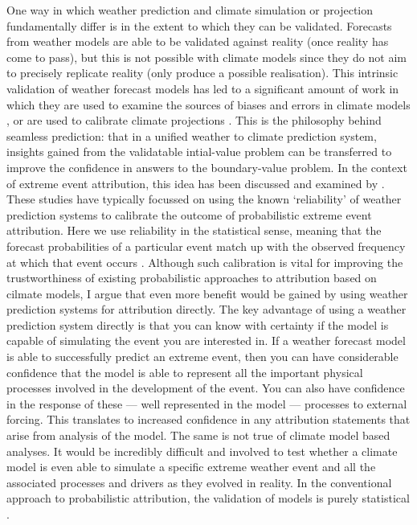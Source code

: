     One way in which weather prediction and climate simulation or projection fundamentally differ is in the extent to which they can be validated. Forecasts from weather models are able to be validated against reality (once reality has come to pass), but this is not possible with climate models since they do not aim to precisely replicate reality (only produce a possible realisation). This intrinsic validation of weather forecast models has led to a significant amount of work in which they are used to examine the sources of biases and errors in climate models \citep{williams_transpose-amip_2013}, or are used to calibrate climate projections \citep{palmer_toward_2008,matsueda_calibrating_2016}. This is the philosophy behind seamless prediction: that in a unified weather to climate prediction system, insights gained from the validatable intial-value problem can be transferred to improve the confidence in answers to the boundary-value problem. In the context of extreme event attribution, this idea has been discussed and examined by \citet{weisheimer_atmospheric_2017,palmer_simple_2018,lott_evaluating_2016,bellprat_attribution_2016,bellprat_towards_2019}. These studies have typically focussed on using the known `reliability' of weather prediction systems to calibrate the outcome of probabilistic extreme event attribution. Here we use reliability in the statistical sense, meaning that the forecast probabilities of a particular event match up with the observed frequency at which that event occurs \citep{weisheimer_reliability_2014}. Although such calibration is vital for improving the trustworthiness of existing probabilistic approaches to attribution based on cilmate models, I argue that even more benefit would be gained by using weather prediction systems for attribution directly. The key advantage of using a weather prediction system directly is that you can know with certainty if the model is capable of simulating the event you are interested in. If a weather forecast model is able to successfully predict an extreme event, then you can have considerable confidence that the model is able to represent all the important physical processes involved in the development of the event. You can also have confidence in the response of these --- well represented in the model --- processes to external forcing. This translates to increased confidence in any attribution statements that arise from analysis of the model. The same is not true of climate model based analyses. It would be incredibly difficult and involved to test whether a climate model is even able to simulate a specific extreme weather event and all the associated processes and drivers as they evolved in reality. In the conventional approach to probabilistic attribution, the validation of models is purely statistical \citep{philip_protocol_2020}.

